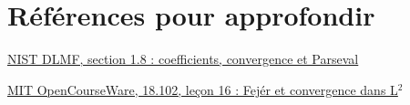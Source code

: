 \documentclass[11pt,a4paper]{article}
\begin{document}
\section*{Références pour approfondir}
\par\href{https://dlmf.nist.gov/1.8}{NIST DLMF, section 1.8 : coefficients, convergence et Parseval}
\par\href{https://ocw.mit.edu/courses/18-102-introduction-to-functional-analysis-spring-2021/resources/lecture-16-fejers-theorem-and-convergence-of-fourier-series/}{MIT OpenCourseWare, 18.102, leçon 16 : Fejér et convergence dans L$^2$}
\end{document}
